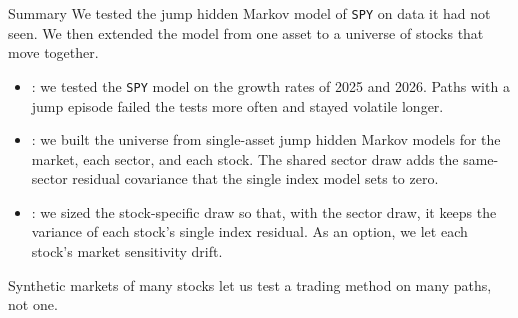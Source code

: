 \documentclass[aspectratio=169,11pt]{beamer}
\begin{document}
\begin{frame}{Summary}
  \vspace{0.3em}
  We tested the jump hidden Markov model of \texttt{SPY} on data it had not seen. We then
  extended the model from one asset to a universe of stocks that move together.

  \vspace{0.4em}
  {\large\textbf{}}
  \begin{itemize}\setlength{\itemsep}{0.4em}
    \item {}: we tested the \texttt{SPY} model on the growth rates of 2025
      and 2026. Paths with a jump episode failed the tests more often and stayed volatile longer.
    \item {}: we built the universe from single-asset jump hidden Markov
      models for the market, each sector, and each stock. The shared sector draw adds the
      same-sector residual covariance that the single index model sets to zero.
    \item {}: we sized the stock-specific draw so that, with the sector
      draw, it keeps the variance of each stock's single index residual. As an option, we let
      each stock's market sensitivity drift.
  \end{itemize}
  \vspace{0.3em}
  Synthetic markets of many stocks let us test a trading method on many paths, not one.
\end{frame}
\end{document}
